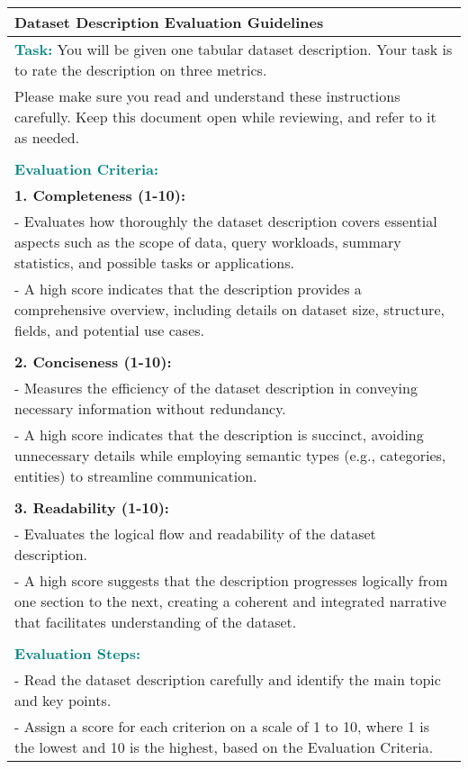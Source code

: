 \begin{table*}
    \small
    \centering
    \begin{tabular}{p{14cm}}
    \toprule
    \textbf{Dataset Description Evaluation Guidelines} \\
    \midrule
    \textcolor{teal}{\textbf{Task:}} 
    You will be given one tabular dataset description. Your task is to rate the description on three metrics. \\
    Please make sure you read and understand these instructions carefully. Keep this document open while reviewing, and refer to it as needed. \\
    \\
    \textcolor{teal}{\textbf{Evaluation Criteria:}} \\
    \textbf{1. Completeness (1-10):} \\
    - Evaluates how thoroughly the dataset description covers essential aspects such as the scope of data, query workloads, summary statistics, and possible tasks or applications. \\
    - A high score indicates that the description provides a comprehensive overview, including details on dataset size, structure, fields, and potential use cases. \\
    \\
    \textbf{2. Conciseness (1-10):} \\
    - Measures the efficiency of the dataset description in conveying necessary information without redundancy. \\
    - A high score indicates that the description is succinct, avoiding unnecessary details while employing semantic types (e.g., categories, entities) to streamline communication. \\
    \\
    \textbf{3. Readability (1-10):} \\
    - Evaluates the logical flow and readability of the dataset description. \\
    - A high score suggests that the description progresses logically from one section to the next, creating a coherent and integrated narrative that facilitates understanding of the dataset. \\
    \\
    \textcolor{teal}{\textbf{Evaluation Steps:}} \\
    - Read the dataset description carefully and identify the main topic and key points. \\
    - Assign a score for each criterion on a scale of 1 to 10, where 1 is the lowest and 10 is the highest, based on the Evaluation Criteria. \\

\end{tabular}
\end{table*}
